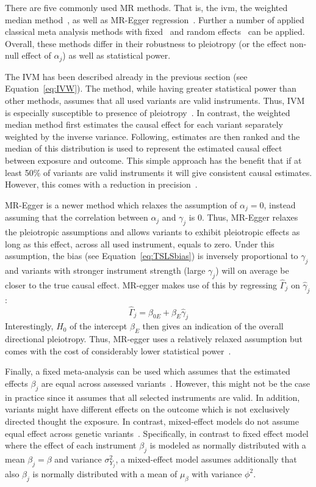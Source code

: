 There are five commonly used MR methods.
That is, the \acrfull{ivm}, the weighted median method~\cite{Bowden2016}, as well as MR-Egger regression~\cite{Bowden2015}.
Further a number of applied classical meta analysis methods with fixed~\cite{Nelson2015a} and random effects~\cite{Ahmad2015} can be applied.
Overall, these methods differ in their robustness to pleiotropy (or the effect non-null effect of $\alpha_j$) as well as statistical power.

The IVM has been described already in the previous section (see Equation~\ref{eq:IVW}).
The method, while having greater statistical power than other methods, assumes that all used variants are valid instruments.
Thus, IVM is especially susceptible to presence of pleiotropy~\cite{Burgess2015b}.
In contrast, the weighted median method first estimates the causal effect for each variant separately weighted by the inverse variance. 
Following, estimates are then ranked and the median of this distribution is used to represent the estimated causal effect between exposure and outcome.
This simple approach has the benefit that if at least 50\% of variants are valid instruments it will give consistent causal estimates.
However, this comes with a reduction in precision~\cite{Bowden2015}.

MR-Egger is a newer method which relaxes the assumption of $\alpha_j=0$, instead  assuming that the correlation between $\alpha_j$ and $\gamma_j$ is $0$.
Thus, MR-Egger relaxes the pleiotropic assumptions and allows variants to exhibit pleiotropic effects as long as this effect, across all used instrument, equals to zero.
Under this assumption, the bias (see Equation~\ref{eq:TSLSbias}) is inversely proportional to $\gamma_j$ and variants with stronger instrument strength (large $\gamma_j$) will on average be closer to the true causal effect.
MR-egger makes use of this by regressing $\hat{\Gamma}_j$ on $\hat{\gamma}_j$:
\begin{equation}\label{eq:egger}
  \hat{\Gamma}_j = \beta_{0E} + \beta_{E} \hat{\gamma}_j
\end{equation}
Interestingly, $H_0$ of the intercept $\beta_E$ then gives an indication of the overall directional pleiotropy.
Thus, MR-egger uses a relatively relaxed assumption but comes with the cost of  considerably lower statistical power~\cite{Bowden2015}.

Finally, a fixed meta-analysis can be used which assumes that the estimated effects $\beta_j$ are equal across assessed variants~\cite{Burgess2015b}.
However, this might not be the case in practice since it assumes that all selected instruments are valid.
In addition, variants might have different effects on the outcome which is not exclusively directed thought the exposure. 
In contrast, mixed-effect models do not assume equal effect across genetic variants~\cite{Burgess2015b}.
Specifically, in contrast to fixed effect model where the effect of each instrument $\beta_j$ is modeled as normally distributed with a  mean $\beta_j = \beta$ and variance $\sigma_{Y_j}^2$, a mixed-effect model assumes additionally that also $\beta_j$ is normally distributed with a mean of $\mu_\beta$ with variance $\phi^2$.

